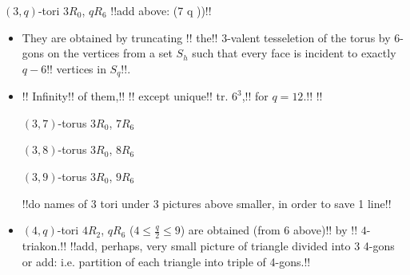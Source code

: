 \documentclass[%
pdf,
colorBG,
slideColor,
]{prosper}
\begin{document}
\begin{slide}{$(3,q)$-tori $3R_0$, $qR_6$}
!!add above: (7 \le q ))!!
\begin{itemize}
\item They are obtained by truncating 
!!%
the!! $3$-valent tesseletion of the torus by $6$-gons on the vertices
from a set $S_h$ 
such that every face is incident to exactly $q-6$!! vertices in $S_q$!!. 
\item 
!!%
Infinity!! of them,!! 
!!%
except unique!! tr. $6^3$,!! for 
$q=12$.!!
!!%
\begin{center}
\begin{minipage}{3.5cm}
\centering
{}\par
$(3,7)$-torus $3R_0$, $7R_6$
\end{minipage}
\begin{minipage}{3.5cm}
\centering
{}\par
$(3,8)$-torus $3R_0$, $8R_6$
\end{minipage}
\begin{minipage}{3.5cm}
\centering
{}\par
$(3,9)$-torus $3R_0$, $9R_6$
\end{minipage}
\end{center}
!!do names of 3 tori under 3 pictures above smaller, in order to save 1 
line!!
\item $(4,q)$-tori $4R_2$, $qR_6$ ($4 \le \frac{q}{2} \le 9$)
are obtained (from 6 above)!! by 
!!%
$4$-triakon.!!
!!add, perhaps, very small picture of triangle divided into 3 4-gons
or add: i.e. partition of each triangle into triple of 4-gons.!!

\end{itemize}
\end{slide}
\end{document}
